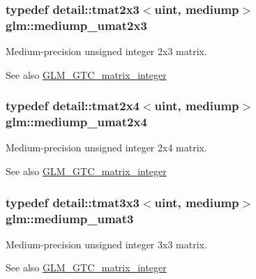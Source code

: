 \subsubsection[{\texorpdfstring{mediump\+\_\+umat2x3}{mediump_umat2x3}}]{\setlength{\rightskip}{0pt plus 5cm}typedef detail\+::tmat2x3$<$uint, mediump$>$ {\bf glm\+::mediump\+\_\+umat2x3}}\hypertarget{group__gtc__matrix__integer_gaaae45c5dbaad1ecd57bfa936d851be1b}{}\label{group__gtc__matrix__integer_gaaae45c5dbaad1ecd57bfa936d851be1b}
Medium-\/precision unsigned integer 2x3 matrix. \begin{DoxySeeAlso}{See also}
\hyperlink{group__gtc__matrix__integer}{G\+L\+M\+\_\+\+G\+T\+C\+\_\+matrix\+\_\+integer} 
\end{DoxySeeAlso}
\subsubsection[{\texorpdfstring{mediump\+\_\+umat2x4}{mediump_umat2x4}}]{\setlength{\rightskip}{0pt plus 5cm}typedef detail\+::tmat2x4$<$uint, mediump$>$ {\bf glm\+::mediump\+\_\+umat2x4}}\hypertarget{group__gtc__matrix__integer_gaf79e9c80f024d31f3d66ddae75e90b6c}{}\label{group__gtc__matrix__integer_gaf79e9c80f024d31f3d66ddae75e90b6c}
Medium-\/precision unsigned integer 2x4 matrix. \begin{DoxySeeAlso}{See also}
\hyperlink{group__gtc__matrix__integer}{G\+L\+M\+\_\+\+G\+T\+C\+\_\+matrix\+\_\+integer} 
\end{DoxySeeAlso}
\subsubsection[{\texorpdfstring{mediump\+\_\+umat3}{mediump_umat3}}]{\setlength{\rightskip}{0pt plus 5cm}typedef detail\+::tmat3x3$<$uint, mediump$>$ {\bf glm\+::mediump\+\_\+umat3}}\hypertarget{group__gtc__matrix__integer_ga123f7d8bac8849e3a150bdf8a21e44a2}{}\label{group__gtc__matrix__integer_ga123f7d8bac8849e3a150bdf8a21e44a2}
Medium-\/precision unsigned integer 3x3 matrix. \begin{DoxySeeAlso}{See also}
\hyperlink{group__gtc__matrix__integer}{G\+L\+M\+\_\+\+G\+T\+C\+\_\+matrix\+\_\+integer} 
\end{DoxySeeAlso}

